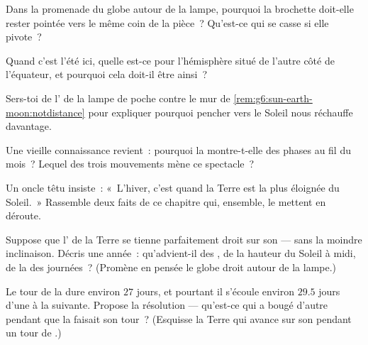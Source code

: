 \begin{exercise}[$\star$]\label{exo:g6:sun-earth-moon:5}
Dans la promenade du globe autour de la lampe, pourquoi la brochette
doit-elle rester pointée vers le même coin de la pièce~? Qu'est-ce
qui se casse si elle pivote~?
\end{exercise}

\begin{exercise}[$\star$]\label{exo:g6:sun-earth-moon:6}
Quand c'est l'été ici, quelle  est-ce pour l'hémisphère situé
de l'autre côté de l'équateur, et pourquoi cela doit-il être ainsi~?
\end{exercise}

\begin{exercise}[$\star$]\label{exo:g6:sun-earth-moon:7}
Sers-toi de l' de la lampe de poche contre le mur de
\cref{rem:g6:sun-earth-moon:notdistance} pour expliquer pourquoi
pencher vers le Soleil nous réchauffe davantage.
\end{exercise}

\begin{exercise}[$\star$]\label{exo:g6:sun-earth-moon:8}
Une vieille connaissance revient~: pourquoi la  montre-t-elle des
phases au fil du mois~? Lequel des trois mouvements mène ce
spectacle~?
\end{exercise}

\begin{exercise}[$\star\star$]\label{exo:g6:sun-earth-moon:9}
Un oncle têtu insiste~: «~L'hiver, c'est quand la Terre est la plus
éloignée du Soleil.~» Rassemble deux faits de ce chapitre qui,
ensemble, le mettent en déroute.
\end{exercise}

\begin{exercise}[$\star\star$]\label{exo:g6:sun-earth-moon:10}
Suppose que l' de la Terre se tienne parfaitement droit sur son
 --- sans la moindre inclinaison. Décris une année~:
qu'advient-il des , de la hauteur du Soleil à midi, de la
 des journées~? (Promène en pensée le globe droit autour de la
lampe.)
\end{exercise}

\begin{exercise}[$\star\star$]\label{exo:g6:sun-earth-moon:11}
Le tour de la  dure environ $27$ jours, et pourtant il s'écoule
environ $29.5$ jours d'une  à la suivante. Propose la
résolution --- qu'est-ce qui a bougé d'autre pendant que la 
faisait son tour~? (Esquisse la Terre qui avance sur son 
pendant un tour de .)
\end{exercise}


